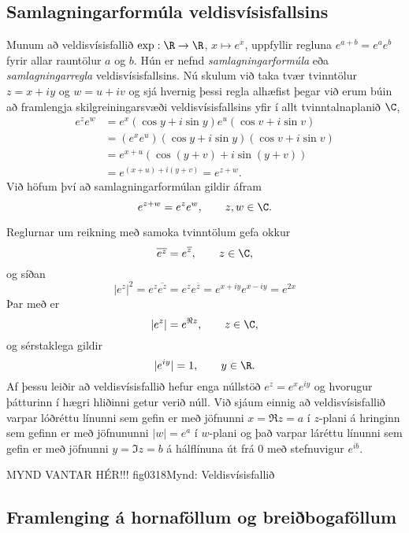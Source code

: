 \subsection*{Samlagningarformúla veldisvísisfallsins}

Munum að veldisvísisfallið $\exp: \R\to \R$,  $x\mapsto e^x$, uppfyllir
regluna $e^{a+b}=e^ae^b$ fyrir allar rauntölur $a$ og $b$.  
Hún er nefnd {\it samlagningarformúla } eða {\it samlagningarregla}
veldisvísisfallsins.
Nú  skulum við taka tvær tvinntölur $z=x+iy$ og $w=u+iv$ og sjá hvernig
þessi regla alhæfist þegar við erum búin að framlengja
skilgreiningarsvæði veldisvísisfallsins yfir í allt tvinntalnaplanið
$\C$,
\begin{align*}
e^ze^w &=e^x(\cos y+i\sin y)e^u(\cos v+i\sin v) \\
 & =(e^xe^u)(\cos y+i\sin y)(\cos v+i\sin v) \\
 & =e^{x+u}(\cos(y+v)+i\sin (y+v))\\
 & =e^{(x+u)+i(y+v)}=e^{z+w}.
\end{align*}
Við höfum því að samlagningarformúlan gildir áfram
$$
e^{z+w}=e^ze^w, \qquad z,w\in \C.
$$


Reglurnar um reikning með samoka tvinntölum gefa
okkur
$$\overline{e^z}=e^{\overline z},\qquad z\in \C,
$$
og síðan
 $$|e^z|^2=e^z\overline{e^{z}}=e^ze^{\overline z}=e^{x+iy}e^{x-iy}=e^{2x}
 $$
Þar með er
 $$|e^z|=e^{\Re z}, \qquad z\in \C,
 $$
og sérstaklega gildir 
$$
|e^{iy}|=1, \qquad y\in \R.
$$
Af þessu leiðir  að veldisvísisfallið hefur enga
núllstöð
$e^z=e^xe^{iy}$ og  hvorugur þátturinn í hægri hliðinni getur verið
núll.  Við sjáum einnig að veldisvísisfallið varpar lóðréttu línunni
sem gefin er með jöfnunni 
$x=\Re z=a$ í $z$-plani á hringinn sem gefinn er með jöfnununni 
$|w|=e^a$ í $w$-plani og það varpar
láréttu línunni sem gefin er með jöfnunni  $y=\Im z=b$ á hálflínuna
út frá $0$ með stefnuvigur $e^{ib}$.  

MYND VANTAR HÉR!!! {fig0318}{Mynd: Veldisvísisfallið}



\subsection*{Framlenging á hornaföllum og breiðbogaföllum}

